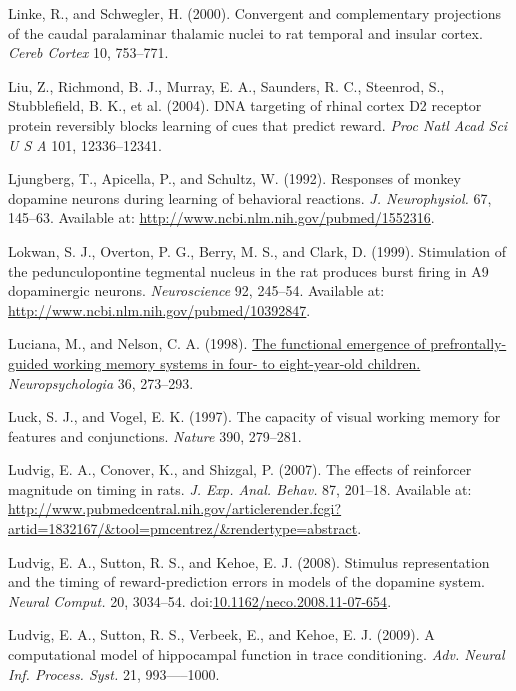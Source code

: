 \documentclass[
  11pt,
  a4paper,
]{scrbook}
\newlength{\cslhangindent}
\newenvironment{CSLReferences}[2] %
 {\begin{list}{}{%
  \setlength{\itemindent}{0pt}
  \setlength{\leftmargin}{0pt}
  \setlength{\parsep}{0pt}
  \ifodd #1
   \setlength{\leftmargin}{\cslhangindent}
   \setlength{\itemindent}{-1\cslhangindent}
  \fi
  \setlength{\itemsep}{#2\baselineskip}}}
 {\end{list}}
\begin{document}
\begin{CSLReferences}{1}{1}
Linke, R., and Schwegler, H. (2000). Convergent and complementary
projections of the caudal paralaminar thalamic nuclei to rat temporal
and insular cortex. \emph{Cereb Cortex} 10, 753--771.

Liu, Z., Richmond, B. J., Murray, E. A., Saunders, R. C., Steenrod, S.,
Stubblefield, B. K., et al. (2004). {DNA} targeting of rhinal cortex
{D2} receptor protein reversibly blocks learning of cues that predict
reward. \emph{Proc Natl Acad Sci U S A} 101, 12336--12341.

Ljungberg, T., Apicella, P., and Schultz, W. (1992). {Responses of
monkey dopamine neurons during learning of behavioral reactions.}
\emph{J. Neurophysiol.} 67, 145--63. Available at:
\url{http://www.ncbi.nlm.nih.gov/pubmed/1552316}.

Lokwan, S. J., Overton, P. G., Berry, M. S., and Clark, D. (1999).
{Stimulation of the pedunculopontine tegmental nucleus in the rat
produces burst firing in A9 dopaminergic neurons.} \emph{Neuroscience}
92, 245--54. Available at:
\url{http://www.ncbi.nlm.nih.gov/pubmed/10392847}.

Luciana, M., and Nelson, C. A. (1998).
\href{https://www.ncbi.nlm.nih.gov/pubmed/9622192}{The functional
emergence of prefrontally-guided working memory systems in four- to
eight-year-old children.} \emph{Neuropsychologia} 36, 273--293.

Luck, S. J., and Vogel, E. K. (1997). The capacity of visual working
memory for features and conjunctions. \emph{Nature} 390, 279--281.

Ludvig, E. A., Conover, K., and Shizgal, P. (2007). {The effects of
reinforcer magnitude on timing in rats.} \emph{J. Exp. Anal. Behav.} 87,
201--18. Available at:
\url{http://www.pubmedcentral.nih.gov/articlerender.fcgi?artid=1832167/&tool=pmcentrez/&rendertype=abstract}.

Ludvig, E. A., Sutton, R. S., and Kehoe, E. J. (2008). {Stimulus
representation and the timing of reward-prediction errors in models of
the dopamine system.} \emph{Neural Comput.} 20, 3034--54.
doi:\href{https://doi.org/10.1162/neco.2008.11-07-654}{10.1162/neco.2008.11-07-654}.

Ludvig, E. A., Sutton, R. S., Verbeek, E., and Kehoe, E. J. (2009). {A
computational model of hippocampal function in trace conditioning}.
\emph{Adv. Neural Inf. Process. Syst.} 21, 993-----1000.


\end{CSLReferences}
\end{document}
